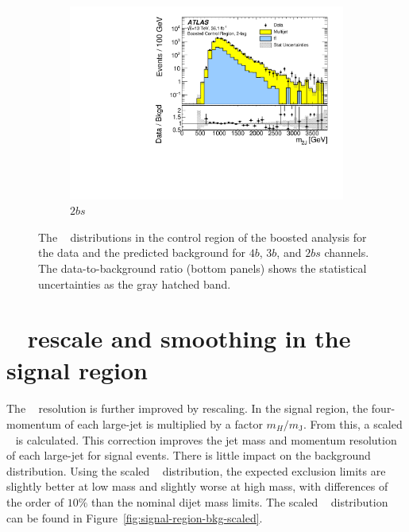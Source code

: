 \begin{figure}[htbp!]
    \\
    \begin{subfigure}[b]{0.35\textwidth}
        \includegraphics[width=\textwidth,angle=-90]{figures/boosted/Paperplot/Moriond_bkg_9_TwoTag_split_Control_mHH_l_1.pdf}
        \caption{$2bs$}
        \label{fig:boosted-cr-mjj-2bs}
    \end{subfigure}
   \caption{The \mtwoJ~ distributions in the control region of the boosted analysis for the data and the predicted background for $4b$, $3b$, and $2bs$ channels. The data-to-background ratio (bottom panels) shows the statistical uncertainties as the gray hatched band.}
  \label{fig:boosted-cr-mjj}
\end{figure}


\section{\mtwoJ~ rescale and smoothing in the signal region}
\label{sec:boosted-SR-smoothing}

\paragraph{}
The \mtwoJ~ resolution is further improved by rescaling.
In the signal region, the four-momentum of each large-\R jet is multiplied by a factor $m_{H}/m_{\mathrm{J}}$.
From this, a scaled \mtwoJ~ is calculated.
This correction improves the jet mass and momentum resolution of each large-\R jet for signal events.
There is little impact on the background distribution.
Using the scaled \mtwoJ~ distribution, the expected exclusion limits are slightly better at low mass and slightly worse at high mass, with differences of the order of $10\%$ than the nominal dijet mass limits.
The scaled \mtwoJ~ distribution can be found in Figure~\ref{fig:signal-region-bkg-scaled}.

